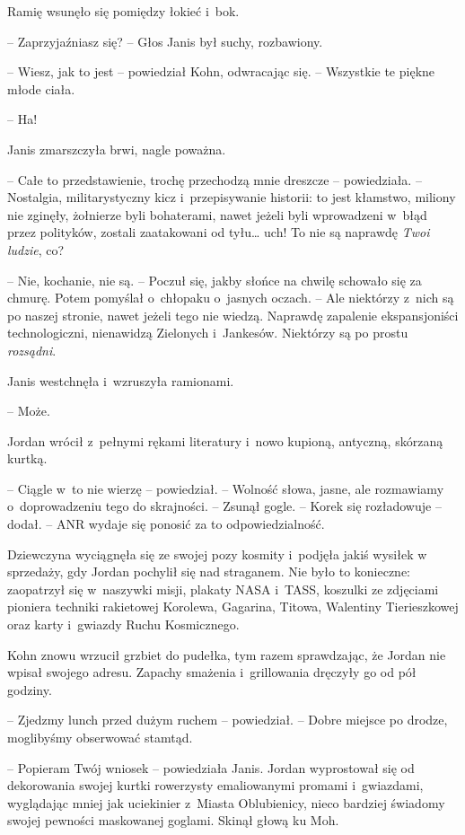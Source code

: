 \documentclass[oneside,polish,11pt,sfheadings]{mwbk}
\begin{document}
Ramię wsunęło się pomiędzy łokieć i~bok.

-- Zaprzyjaźniasz się? -- Głos Janis był suchy, rozbawiony.

-- Wiesz, jak to jest -- powiedział Kohn, odwracając się. -- Wszystkie te
piękne młode ciała.

-- Ha!

Janis zmarszczyła brwi, nagle poważna.

-- Całe to przedstawienie, trochę przechodzą mnie dreszcze -- powiedziała.
-- Nostalgia, militarystyczny kicz i~przepisywanie historii: to jest
kłamstwo, miliony nie zginęły, żołnierze byli bohaterami, nawet jeżeli
byli wprowadzeni w~błąd przez polityków, zostali zaatakowani od tyłu\ldots
uch! To nie są naprawdę \emph{Twoi ludzie}, co?

-- Nie, kochanie, nie są. -- Poczuł się, jakby słońce na chwilę schowało
się za chmurę. Potem pomyślał o~chłopaku o~jasnych oczach. -- Ale
niektórzy z~nich są po naszej stronie, nawet jeżeli tego nie wiedzą.
Naprawdę zapalenie ekspansjoniści technologiczni, nienawidzą Zielonych i~Jankesów. Niektórzy są po prostu \emph{rozsądni}.

Janis westchnęła i~wzruszyła ramionami. 

-- Może.

Jordan wrócił z~pełnymi rękami literatury i~nowo kupioną, antyczną,
skórzaną kurtką. 

-- Ciągle w~to nie wierzę -- powiedział. -- Wolność słowa,
jasne, ale rozmawiamy o~doprowadzeniu tego do skrajności. -- Zsunął
gogle. -- Korek się rozładowuje -- dodał. -- ANR wydaje się ponosić za to
odpowiedzialność.

Dziewczyna wyciągnęła się ze swojej pozy kosmity i~podjęła jakiś wysiłek
w sprzedaży, gdy Jordan pochylił się nad straganem. Nie było to
konieczne: zaopatrzył się w~naszywki misji, plakaty NASA i~TASS,
koszulki ze zdjęciami pioniera techniki rakietowej Korolewa, Gagarina,
Titowa, Walentiny Tierieszkowej oraz karty i~gwiazdy Ruchu Kosmicznego.

Kohn znowu wrzucił grzbiet do pudełka, tym razem sprawdzając, że Jordan
nie wpisał swojego adresu. Zapachy smażenia i~grillowania dręczyły go od
pół godziny.

-- Zjedzmy lunch przed dużym ruchem -- powiedział. -- Dobre miejsce po
drodze, moglibyśmy obserwować stamtąd.

-- Popieram Twój wniosek -- powiedziała Janis. Jordan wyprostował się od
dekorowania swojej kurtki rowerzysty emaliowanymi promami i~gwiazdami,
wyglądając mniej jak uciekinier z~Miasta Oblubienicy, nieco bardziej
świadomy swojej pewności maskowanej goglami. Skinął głową ku Moh.
\end{document}
